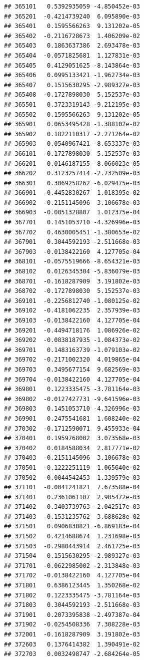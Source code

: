 \documentclass[ignorenonframetext,]{beamer}
\begin{document}
\begin{frame}[fragile]
\begin{verbatim}
## 365101   0.5392935059 -4.850452e-03
## 365201  -0.4214739240  6.095890e-03
## 365401   0.1595566263  9.131202e-05
## 365402  -0.2116728673  1.406209e-02
## 365403   0.1863637386  2.693478e-03
## 365404  -0.0571825681  1.127831e-03
## 365405   0.4129051625 -8.143864e-03
## 365406   0.0995133421 -1.962734e-03
## 365407   0.1515630295 -2.989327e-03
## 365408  -0.1727898030  5.152537e-03
## 365501   0.3723319143 -9.212195e-03
## 365502   0.1595566263  9.131202e-05
## 365901   0.0653495428 -1.388102e-02
## 365902   0.1822110317 -2.271264e-02
## 365903   0.0540967421 -8.653337e-03
## 366101  -0.1727898030  5.152537e-03
## 366201   0.0146187155 -8.066023e-05
## 366202   0.3123257414 -2.732509e-03
## 366301   0.3069258262 -6.029475e-03
## 366901  -0.4452830267  1.018395e-02
## 366902  -0.2151145096  3.106678e-03
## 366903  -0.0051328807  1.012375e-04
## 367701   0.1451053710 -4.326996e-03
## 367702   0.4630005451 -1.380653e-02
## 367901   0.3044592193 -2.511668e-03
## 367903  -0.0138422160  4.127705e-04
## 368101  -0.0575519666 -8.654321e-03
## 368102   0.0126345304 -5.836079e-03
## 368701  -0.1618287909  3.191802e-03
## 368702  -0.1727898030  5.152537e-03
## 369101  -0.2256812740 -1.080125e-02
## 369102  -0.4181062235  2.357939e-03
## 369103  -0.0138422160  4.127705e-04
## 369201  -0.4494718176  1.086926e-02
## 369202  -0.0838187935 -1.084373e-02
## 369701   0.1483163739 -1.079103e-02
## 369702  -0.2171002320  4.019865e-04
## 369703   0.3495677154  9.682569e-03
## 369704  -0.0138422160  4.127705e-04
## 369801   0.1223335475 -3.781164e-03
## 369802  -0.0127427731 -9.641596e-03
## 369803   0.1451053710 -4.326996e-03
## 369901   0.2475541681  1.608240e-02
## 370302  -0.1712590071  9.455933e-04
## 370401   0.1959768002  3.073568e-03
## 370402   0.0184588034  2.817771e-02
## 370403  -0.2151145096  3.106678e-03
## 370501  -0.1222251119  1.065640e-02
## 370502  -0.0044542453  1.339579e-03
## 371101  -0.0041241821  7.673588e-04
## 371401   0.2361061107  2.905472e-03
## 371402   0.3403739763 -2.042517e-03
## 371403  -0.1531235762  3.688628e-02
## 371501   0.0906830821 -6.869183e-04
## 371502   0.4214688674  1.231698e-03
## 371503  -0.2980443914  2.461725e-03
## 371504   0.1515630295 -2.989327e-03
## 371701  -0.0622985002 -2.313848e-03
## 371702  -0.0138422160  4.127705e-04
## 371801   0.6386123445  1.350268e-02
## 371802   0.1223335475 -3.781164e-03
## 371803   0.3044592193 -2.511668e-03
## 371901   0.2073395838 -2.497387e-04
## 371902  -0.0254508336  7.308228e-03
## 372001  -0.1618287909  3.191802e-03
## 372603   0.1376414382  1.390491e-02
## 372703   0.0032498747 -2.684264e-05

\end{verbatim}
\end{frame}
\end{document}
